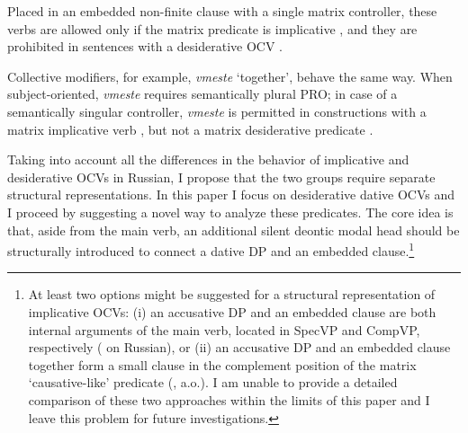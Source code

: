 \documentclass[output=paper,
colorlinks,
citecolor=brown,
newtxmath
]{langscibook}
\begin{document}
\noindent Placed in an embedded non-finite clause with a single matrix controller, these verbs are allowed only if the matrix predicate is implicative , and they are prohibited in sentences with a desiderative OCV .

\ea\label{ex11}
\z
\z

\noindent Collective modifiers, for example, \textit{vmeste} `together’, behave the same way. When subject-oriented, \textit{vmeste} requires semantically plural PRO; in case of a semantically singular controller, \textit{vmeste} is permitted in constructions with a matrix implicative verb , but not a matrix desiderative predicate .

\ea\label{ex12} 
\z
\z

\noindent Taking into account all the differences in the behavior of implicative and desiderative OCVs in Russian, I propose that the two groups require separate structural representations. In this paper I focus on desiderative dative OCVs and I proceed by suggesting a novel way to analyze these predicates. The core idea is that, aside from the main verb, an additional silent deontic modal head should be structurally introduced to connect a dative DP and an embedded clause.\footnote{At least two options might be suggested for a structural representation of implicative OCVs: (i) an accusative DP and an embedded clause are both internal arguments of the main verb, located in SpecVP and CompVP, respectively (\citealt{Babby1998, Bailyn2012} on Russian), or (ii) an accusative DP and an embedded clause together form a small clause in the complement position of the matrix `causative-like’ predicate (\citealt{FranksHornstein1992, Landau2015}, a.o.). I am unable to provide a detailed comparison of these two approaches within the limits of this paper and I leave this problem for future investigations.} 
\end{document}
